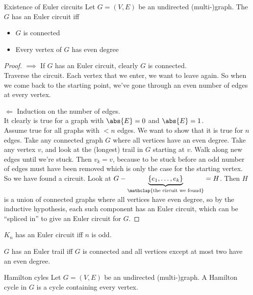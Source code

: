 \documentclass[english]{lbscript}
\begin{document}
\begin{theorem}{Existence of Euler circuits}{}
  Let \(G=(V,E)\) be an undirected (multi-)graph. \tcblower
  The \(G\) has an Euler circuit iff
  \begin{itemize}
    \item \(G\) is connected
    \item Every vertex of \(G\) has even degree
  \end{itemize}
\end{theorem}
\begin{proof}
  \(⟹\) If \(G\) has an Euler circuit, clearly \(G\) is connected.\\
  Traverse the circuit. Each vertex that we enter, we want to leave again. So when we come back to the starting point, we've gone through an even number of edges at every vertex.

  \(\Longleftarrow\) Induction on the number of edges.\\
  It clearly is true for a graph with \(\abs{E}=0\) and \(\abs{E}=1\).\\
  Assume true for all graphs with \(<n\) edges. We want to show that it is true for \(n\) edges. Take any connected graph \(G\) where all vertices have an even degree. Take any vertex \(v\), and look at the (longest) trail in \(G\) starting at \(v\). Walk along new edges until we're stuck. Then \(v_k=v\), because to be stuck before an odd number of edges must have been removed which is only the case for the starting vertex. So we have found a circuit. Look at \(G-\underbrace{\left\{ e_1, \dots, e_k \right\}}_{\mathclap{\text{the circuit we found}}} = H\). Then \(H\) is a union of connected graphs where all vertices have even degree, so by the inductive hypothesis, each such component has an Euler circuit, which can be \enquote{spliced in} to give an Euler circuit for \(G\).
\end{proof}

\begin{corollary}{}{}
  \(K_n\) has an Euler circuit iff \(n\) is odd.
\end{corollary}

\begin{corollary}{}{}
  \(G\) has an Euler trail iff \(G\) is connected and all vertices except at most two have an even degree.
\end{corollary}

\begin{definition}{Hamilton cyles}{}
  Let \(G=(V,E)\) be an undirected (multi-)graph. A Hamilton cycle in \(G\) is a cycle containing every vertex.
\end{definition}
\end{document}
